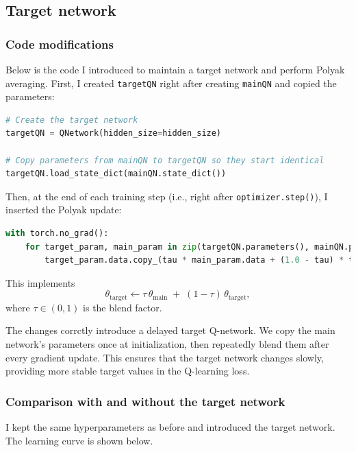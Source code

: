 \subsection{Target network}

\subsubsection*{Code modifications}
Below is the code I introduced to maintain a target network and perform Polyak averaging. First, I created \texttt{targetQN} right after creating \texttt{mainQN} and copied the parameters:
\begin{lstlisting}[language=Python]
# Create the target network
targetQN = QNetwork(hidden_size=hidden_size)

# Copy parameters from mainQN to targetQN so they start identical
targetQN.load_state_dict(mainQN.state_dict())
\end{lstlisting}

Then, at the end of each training step (i.e., right after \texttt{optimizer.step()}), I inserted the Polyak update:
\begin{lstlisting}[language=Python]
with torch.no_grad():
    for target_param, main_param in zip(targetQN.parameters(), mainQN.parameters()):
        target_param.data.copy_(tau * main_param.data + (1.0 - tau) * target_param.data)
\end{lstlisting}

This implements
\[
\theta_{\text{target}} \leftarrow \tau \,\theta_{\text{main}} \;+\; (1 - \tau)\,\theta_{\text{target}},
\]
where \(\tau \in (0,1)\) is the blend factor. 

The changes corrctly introduce a delayed target Q-network. We copy the main network's parameters once at initialization, then repeatedly blend them after every gradient update. This ensures that the target network changes slowly, providing more stable target values in the Q-learning loss.

\subsubsection*{Comparison with and without the target network}
I kept the same hyperparameters as before and introduced the target network. The learning curve is shown below.


